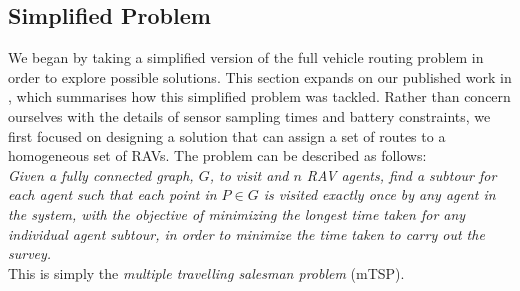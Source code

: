 \subsection{Simplified Problem}
We began by taking a simplified version of the full vehicle routing problem in order to explore possible solutions. This section expands on our published work in \cite{Smyth2018UsingDrones}, which summarises how this simplified problem was tackled. Rather than concern ourselves with the details of sensor sampling times and battery constraints, we first focused on designing a solution that can assign a set of routes to a homogeneous set of RAVs. 
The problem can be described as follows:
\\
\textit{Given a fully connected graph, $G$, to visit and $n$ RAV agents, find a subtour for each agent such that each point in $P \in G$ is visited exactly once by any agent in the system, with the objective of minimizing the longest time taken for any individual agent subtour, in order to minimize the time taken to carry out the survey.}
\\
This is simply the \textit{ multiple travelling salesman problem} (mTSP). 


